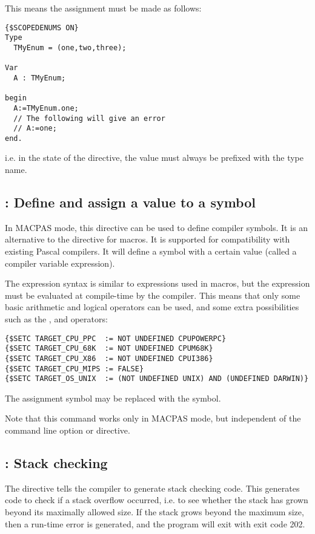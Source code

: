 This means the assignment must be made as follows:
\begin{verbatim}
{$SCOPEDENUMS ON}
Type
  TMyEnum = (one,two,three);

Var
  A : TMyEnum;

begin
  A:=TMyEnum.one;
  // The following will give an error
  // A:=one;
end.
\end{verbatim}
i.e. in the  state of the directive, the value must always be prefixed with the type name.

\subsection{ : Define and assign a value to a symbol}

In MACPAS mode, this directive can be used to define compiler symbols. It is
an alternative to the  directive for macros. It is supported for 
compatibility with existing \macos Pascal compilers. It will define a symbol
with a certain value (called a compiler variable expression). 

The expression syntax is similar to expressions used in macros, but the
expression must be evaluated at compile-time by the compiler. This means
that only some basic arithmetic and logical operators can be used,
and some extra possibilities such as the , and 
operators:
\begin{verbatim}
{$SETC TARGET_CPU_PPC  := NOT UNDEFINED CPUPOWERPC}
{$SETC TARGET_CPU_68K  := NOT UNDEFINED CPUM68K}
{$SETC TARGET_CPU_X86  := NOT UNDEFINED CPUI386}
{$SETC TARGET_CPU_MIPS := FALSE}
{$SETC TARGET_OS_UNIX  := (NOT UNDEFINED UNIX) AND (UNDEFINED DARWIN)}
\end{verbatim}
The \var{:=} assignment symbol may be replaced with the \var{=} symbol.

Note that this command works only in MACPAS mode, but independent of the
 command line option or  directive.

\subsection{ : Stack checking}

The  directive tells the compiler to generate stack checking
code. This generates code to check if a stack overflow occurred, i.e. to see
whether the stack has grown beyond its maximally allowed size. If the stack
grows beyond the maximum size, then a run-time error is generated, and the
program will exit with exit code 202.

